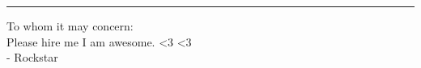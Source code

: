 \documentclass[10pt]{akshay-resume}
\begin{document}
%
%


\vspace{1em}

%
%

\begin{center}
	\textcolor[RGB]{220,220,220}{\rule{\textwidth}{0.2pt}}
\end{center}
\vspace{1em}

\begin{minipage}[t]{0.9\linewidth} 
To whom it may concern:\\

Please hire me I am awesome. <3 <3 \\

- Rockstar

\end{minipage} 
\end{document}
